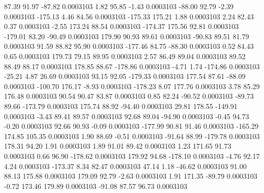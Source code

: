        87.39       91.97      -87.82     0.0003103
        1.82       95.85       -1.43     0.0003103
      -88.00       92.79       -2.39     0.0003103
     -175.13        4.46       84.56     0.0003103
     -175.33      175.21        1.88     0.0003103
        2.24       82.43        0.37     0.0003103
       -2.55      173.24       88.54     0.0003103
     -174.37      175.56       92.81     0.0003103
     -179.01       83.20      -90.49     0.0003103
      179.90       90.93       89.61     0.0003103
      -90.83       89.51       81.79     0.0003103
       91.59       88.82       95.90     0.0003103
     -177.46       84.75      -88.30     0.0003103
        0.52       84.43        0.65     0.0003103
      179.73       79.15       89.95     0.0003103
        2.57       86.49       89.04     0.0003103
       89.52       88.49       88.17     0.0003103
      178.85       88.67     -178.86     0.0003103
       -4.71        1.74     -174.86     0.0003103
      -25.21        4.87       26.69     0.0003103
       93.15       92.05     -179.33     0.0003103
      177.54       87.61      -88.09     0.0003103
     -100.70      176.17       -8.93     0.0003103
     -178.23        8.07      177.76     0.0003103
        3.78       85.29      176.48     0.0003103
       90.54       90.47       83.87     0.0003103
        0.85       82.24      -90.52     0.0003103
      -89.73       89.66     -173.79     0.0003103
      175.74       88.92      -94.40     0.0003103
       29.81      178.55     -149.91     0.0003103
       -3.43       89.41       89.57     0.0003103
       92.68       89.04      -94.90     0.0003103
       -0.45       94.73       -0.20     0.0003103
       92.66       90.93       -0.09     0.0003103
     -177.99       90.81       91.46     0.0003103
     -165.29      174.85      105.35     0.0003103
        1.90       88.69       -0.51     0.0003103
      -91.64       88.99     -179.78     0.0003103
      178.31       94.20        1.91     0.0003103
        1.89       91.01       89.42     0.0003103
        1.23      171.65       91.73     0.0003103
        0.66       96.90     -178.62     0.0003103
      179.92       94.68     -178.10     0.0003103
       -4.76       92.17        4.24     0.0003103
     -173.37        8.34       82.47     0.0003103
       47.14        1.18      -46.62     0.0003103
       91.00       88.13      175.88     0.0003103
      179.09       92.79       -2.63     0.0003103
        1.91      171.35      -89.79     0.0003103
       -0.72      173.46      179.89     0.0003103
      -91.08       87.57       96.73     0.0003103

